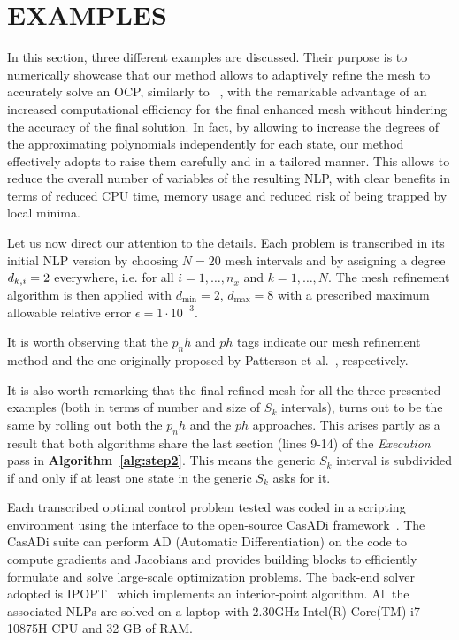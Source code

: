 \section*{EXAMPLES}
In this section, three different examples are discussed. Their purpose is to numerically showcase that our method allows to adaptively refine the mesh to accurately solve an OCP, similarly to ~\cite{Patterson:OCAM:2015}, with the remarkable advantage of an increased computational efficiency for the final enhanced mesh without hindering the accuracy of the final solution. 
In fact, by allowing to increase the degrees of the approximating polynomials independently for each state, our method effectively adopts to raise them carefully and in a tailored manner. This allows to reduce the overall number of variables of the resulting NLP, with clear benefits in terms of reduced CPU time, memory usage and reduced risk of being trapped by local minima.

Let us now direct our attention to the details. Each problem is transcribed in its initial NLP version by choosing $N = 20$ mesh intervals and by assigning a degree $d_{k,i} = 2$ everywhere, i.e. for all $i = 1, \dots, n_x$ and  $k = 1, \dots, N$. The mesh refinement algorithm is then applied with $d_{\min} = 2$, $d_{\max} = 8$ with a prescribed maximum allowable relative error $\epsilon = 1 \cdot 10^{-3}$.

It is worth observing that the $p_{n}h$ and $ph$ tags indicate our mesh refinement method and the one originally proposed by Patterson et al.~\cite{Patterson:OCAM:2015}, respectively.

It is also worth remarking that the final refined mesh for all the three presented examples (both in terms of number and size of $S_{k}$ intervals), turns out to be the same by rolling out both the $p_{n}h$ and the $ph$ approaches. This arises partly as a result that both algorithms share the last section (lines 9-14) of the \emph{Execution} pass in {\bf Algorithm~\ref{alg:step2}}. This means the generic $S_k$ interval is subdivided if and only if at least one state in the generic $S_k$ asks for it.

Each transcribed optimal control problem tested was coded in a scripting environment using the  interface to the open-source CasADi framework~\cite{casadi:MPC:2019}.
The CasADi suite can perform AD (Automatic Differentiation) on the code to compute gradients and Jacobians and provides building blocks to efficiently formulate and solve large-scale optimization problems. The back-end solver adopted is IPOPT~\cite{Biegler:CCE:2009} which implements an interior-point algorithm. All the associated NLPs are solved on a laptop with 2.30GHz Intel(R) Core(TM) i7-10875H CPU and 32 GB of RAM.



